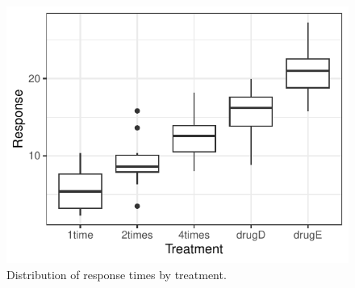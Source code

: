 \documentclass[11pt]{article}\usepackage[]{graphicx}\usepackage[]{xcolor}
\makeatletter
\def\maxwidth{ %
  \ifdim\Gin@nat@width>\linewidth
    \linewidth
  \else
    \Gin@nat@width
  \fi
}
\newenvironment{knitrout}{}{} %
\makeatother
\begin{document}
\begin{figure}[H]\label{figure:tukey}
\begin{center}

\begin{knitrout}
\color{fgcolor}
\includegraphics[width=\maxwidth]{figure/unnamed-chunk-4-1} 
\end{knitrout}
  
\caption{Distribution of response times by treatment.}
\end{center}
\end{figure}
\end{document}
